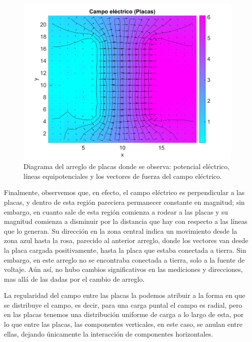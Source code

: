 \documentclass[letterpaper, 11 pt]{article}
\begin{document}
\begin{multicols}{2}
\begin{figure}[H]
	\centering
    \includegraphics[scale=0.05]{finalplacas.jpg}
    \captionsetup{justification=centering,margin=0.5cm}
    \caption{Diagrama del arreglo de placas donde se observa: potencial eléctrico, líneas equipotenciales y los vectores de fuerza del campo eléctrico.}
    \label{finpla}
\end{figure}

Finalmente, observemos que, en efecto, el campo eléctrico es perpendicular a las placas, y dentro de esta región pareciera permanecer constante en magnitud; sin embargo, en cuanto sale de esta región comienza a rodear a las placas y su magnitud comienza a disminuir por la distancia que hay con respecto a las líneas que lo generan. Su dirección en la zona central indica un movimiento desde la zona azul hasta la rosa, parecido al anterior arreglo, donde los vectores van desde la placa cargada positivamente, hasta la placa que estaba conectada a tierra. Sin embargo, en este arreglo no se encontraba conectada a tierra, solo a la fuente de voltaje. Aún así, no hubo cambios significativos en las mediciones y direcciones, mas allá de las dadas por el cambio de arreglo.

La regularidad del campo entre las placas la podemos atribuir a la forma en que se distribuye el campo, es decir, para una carga puntal el campo es radial, pero en las placas tenemos una distribución uniforme de carga a lo largo de esta, por lo que entre las placas, las componentes verticales, en este caso, se anulan entre ellas, dejando únicamente la interacción de componentes horizontales.


\end{multicols}
\end{document}
